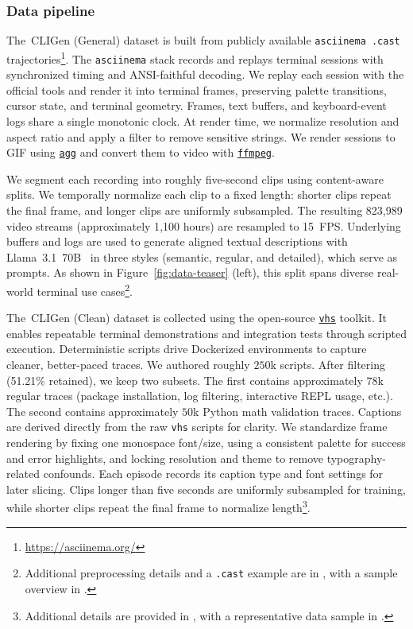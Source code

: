 \subsubsection{Data pipeline}

The \cligenGeneralLogo{}\,CLIGen (General) dataset is built from publicly available \texttt{asciinema .cast} trajectories\footnote{\url{https://asciinema.org/}}.
The \texttt{asciinema} stack records and replays terminal sessions with synchronized timing and ANSI-faithful decoding.
We replay each session with the official tools and render it into terminal frames, preserving palette transitions, cursor state, and terminal geometry.
Frames, text buffers, and keyboard-event logs share a single monotonic clock.
At render time, we normalize resolution and aspect ratio and apply a filter to remove sensitive strings.
We render sessions to GIF using \href{https://github.com/asciinema/agg}{\texttt{agg}} and convert them to video with \href{https://github.com/FFmpeg/FFmpeg}{\texttt{ffmpeg}}.

We segment each recording into roughly five-second clips using content-aware splits. 
We temporally normalize each clip to a fixed length: shorter clips repeat the final frame, and longer clips are uniformly subsampled. 
The resulting 823{,}989 video streams (approximately 1{,}100 hours) are resampled to 15~FPS.
Underlying buffers and logs are used to generate aligned textual descriptions with Llama~3.1~70B~\citep{dubey2024llama} in three styles (semantic, regular, and detailed), which serve as prompts.
As shown in Figure~\ref{fig:data-teaser} (left), this split spans diverse real-world terminal use cases\footnote{Additional preprocessing details and a \texttt{.cast} example are in , with a sample overview in .}.







The \cligenCleanLogo{}\,CLIGen (Clean) dataset is collected using the open-source \href{https://github.com/charmbracelet/vhs}{\texttt{vhs}} toolkit.
It enables repeatable terminal demonstrations and integration tests through scripted execution.
Deterministic scripts drive Dockerized environments to capture cleaner, better-paced traces.
We authored roughly $250$k scripts.
After filtering (51.21\% retained), we keep two subsets.
The first contains approximately $78$k regular traces (package installation, log filtering, interactive REPL usage, etc.).
The second contains approximately $50$k Python math validation traces.
Captions are derived directly from the raw \texttt{vhs} scripts for clarity.
We standardize frame rendering by fixing one monospace font/size, using a consistent palette for success and error highlights, and locking resolution and theme to remove typography-related confounds.
Each episode records its caption type and font settings for later slicing.
Clips longer than five seconds are uniformly subsampled for training, while shorter clips repeat the final frame to normalize length\footnote{Additional details are provided in , with a representative data sample in .}.



